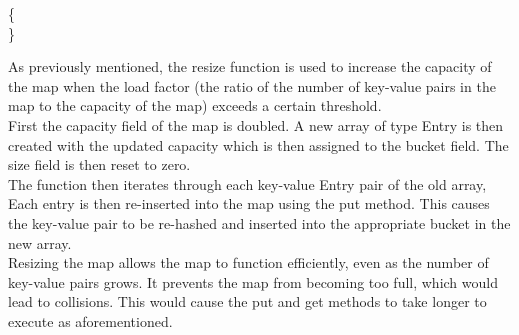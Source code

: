 \documentclass[a4paper]{article}
\begin{document}
\vspace{4mm}
\makeatletter
\renewcommand{\ALG@name}{Hashmap Method}
\makeatother

\begin{algorithm}
\caption{}\label{euclid}
\begin{algorithmic}[1]

\algrenewcommand{}
 {\{ }
\State{}
\State\quad{}
\State\quad{}
\State\quad{\tt \} }
\State{\tt \} } \\
{\}}


\EndProcedure
\end{algorithmic}
\end{algorithm}




As previously mentioned, the resize function is used to increase the capacity of the map when the load factor
(the ratio of the number of key-value pairs in the map to the capacity of the map) exceeds a certain threshold. \\

First the capacity field of the map is doubled. 
A new array of type Entry is then created with the updated capacity
which is then assigned to the bucket field. 
The size field is then reset to zero. \\

The function then iterates through each key-value Entry pair of the old array,
Each entry is then re-inserted into the map using the put method.
This causes the key-value pair to be re-hashed and inserted into the appropriate bucket in the new array. \\

Resizing the map allows the map to function efficiently, 
even as the number of key-value pairs grows. 
It prevents the map from becoming too full,
which would lead to collisions.
This would cause the put and get methods to take longer to execute as aforementioned.


\vspace{4mm}
\pagebreak




\end{document}
